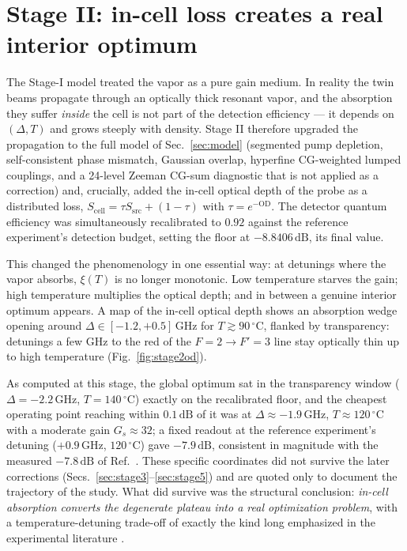 \documentclass[11pt,a4paper]{article}
\newcommand{\dB}{\,\mathrm{dB}}
\newcommand{\GHz}{\,\mathrm{GHz}}
\newcommand{\degC}{\,^{\circ}\mathrm{C}}
\begin{document}
\section{Stage II: in-cell loss creates a real interior optimum}
\label{sec:stage2}
The Stage-I model treated the vapor as a pure gain medium. In reality the
twin beams propagate through an optically thick resonant vapor, and the
absorption they suffer \emph{inside} the cell is not part of the detection
efficiency --- it depends on $(\Delta,T)$ and grows steeply with density.
Stage II therefore upgraded the propagation to the full model of
Sec.~\ref{sec:model} (segmented pump depletion, self-consistent phase
mismatch, Gaussian overlap, hyperfine CG-weighted lumped couplings, and a
24-level Zeeman CG-sum diagnostic that is not applied as a correction) and,
crucially, added the
in-cell optical depth of the probe as a distributed loss,
$S_{\mathrm{cell}}=\tau S_{\mathrm{src}}+(1-\tau)$ with
$\tau=e^{-\mathrm{OD}}$. The detector quantum efficiency was simultaneously
recalibrated to $0.92$ against the reference experiment's detection budget,
setting the floor at $-8.8406\dB$, its final value.

This changed the phenomenology in one essential way: at detunings where the
vapor absorbs, $\xi(T)$ is no longer monotonic. Low temperature starves the
gain; high temperature multiplies the optical depth; and in between a
genuine interior optimum appears. A map of the in-cell optical depth shows
an absorption wedge opening around $\Delta\in[-1.2,+0.5]\GHz$ for
$T\gtrsim 90\degC$, flanked by transparency: detunings a few GHz to the red
of the $F{=}2\to F'{=}3$ line stay optically thin up to high temperature
(Fig.~\ref{fig:stage2od}).

As computed at this stage, the global optimum sat in the transparency window
($\Delta=-2.2\GHz$, $T=140\degC$) exactly on the recalibrated floor, and the
cheapest operating point reaching within $0.1\dB$ of it was at
$\Delta\approx-1.9\GHz$, $T\approx120\degC$ with a moderate gain
$G_s\approx 32$; a fixed readout at the reference experiment's detuning
($+0.9\GHz$, $120\degC$) gave $-7.9\dB$, consistent in magnitude with the
measured $-7.8\dB$ of Ref.~\cite{Sim2025}. These specific coordinates did
not survive the later corrections (Secs.~\ref{sec:stage3}--\ref{sec:stage5})
and are quoted only to document the trajectory of the study. What did
survive was the structural conclusion: \emph{in-cell absorption converts the
degenerate plateau into a real optimization problem}, with a
temperature-detuning trade-off of exactly the kind long emphasized in the
experimental literature \cite{Jasperse2011}.
\end{document}
